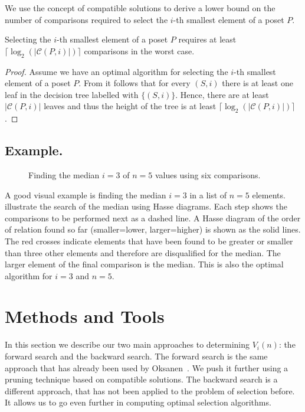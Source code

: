 \documentclass[twoside,leqno,twocolumn]{article}
\begin{document}
We use the concept of compatible solutions to derive a lower bound on the number of comparisons required to select the $i$-th smallest element of a poset $P$.

\begin{theorem}\label{theorem:compatible_log}
  Selecting the $i$-th smallest element of a poset $P$ requires at least $\lceil\log_2(|\mathcal{C}(P, i)|)\rceil$ comparisons in the worst case.
\end{theorem}

\begin{proof}
  Assume we have an optimal algorithm for selecting the $i$-th smallest element of a poset $P$.
  From  it follows that for every $(S, i)$ there is at least one leaf in the decision tree labelled with $\{(S, i)\}$.
  Hence, there are at least $|\mathcal{C}(P, i)|$ leaves and thus the height of the tree is at least $\lceil\log_2(|\mathcal{C}(P, i)|)\rceil$.
\end{proof}


\subsection{Example.}
\begin{figure}[!b]
  \centering
  
  \caption{Finding the median $i = 3$ of $n = 5$ values using six comparisons.}
  \label{fig:median_of_5}
\end{figure}
A good visual example is finding the median $i = 3$ in a list of $n = 5$ elements.
 illustrate the search of the median using Hasse diagrams.
Each step shows the comparisons to be performed next as a dashed line.
A Hasse diagram of the order of relation found so far (smaller=lower, larger=higher) is shown as the solid lines.
The red crosses indicate elements that have been found to be greater or smaller than three other elements and therefore are disqualified for the median.
The larger element of the final comparison is the median.
This is also the optimal algorithm for $i = 3$ and $n = 5$.


\section{Methods and Tools}

In this section we describe our two main approaches to determining $V_i(n)$: the forward search and the backward search.
The forward search is the same approach that has already been used by Oksanen~\cite{Oksanen2006}.
We push it further using a pruning technique based on compatible solutions.
The backward search is a different approach, that has not been applied to the problem of selection before.
It allows us to go even further in computing optimal selection algorithms.
\end{document}
